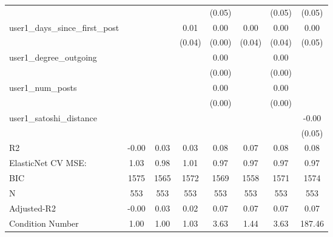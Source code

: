 \begin{table}
\begin{center}
\begin{tabular}{lccccccc}
                                               &          &            &         & (0.05)  &          & (0.05)             & (0.05)   \\
user1_days_since_first_post                    &          &            & 0.01    & 0.00    & 0.00     & 0.00               & 0.00     \\
                                               &          &            & (0.04)  & (0.00)  & (0.04)   & (0.04)             & (0.05)   \\
user1_degree_outgoing                          &          &            &         & 0.00    &          & 0.00               &          \\
                                               &          &            &         & (0.00)  &          & (0.00)             &          \\
user1_num_posts                                &          &            &         & 0.00    &          & 0.00               &          \\
                                               &          &            &         & (0.00)  &          & (0.00)             &          \\
user1_satoshi_distance                         &          &            &         &         &          &                    & -0.00    \\
                                               &          &            &         &         &          &                    & (0.05)   \\
R2                                             & -0.00    & 0.03       & 0.03    & 0.08    & 0.07     & 0.08               & 0.08     \\
ElasticNet CV MSE:                             & 1.03     & 0.98       & 1.01    & 0.97    & 0.97     & 0.97               & 0.97     \\
BIC                                            & 1575     & 1565       & 1572    & 1569    & 1558     & 1571               & 1574     \\
N                                              & 553      & 553        & 553     & 553     & 553      & 553                & 553      \\
Adjusted-R2                                    & -0.00    & 0.03       & 0.02    & 0.07    & 0.07     & 0.07               & 0.07     \\
Condition Number                               & 1.00     & 1.00       & 1.03    & 3.63    & 1.44     & 3.63               & 187.46   \\
\hline
\end{tabular}
\end{center}
\end{table}
